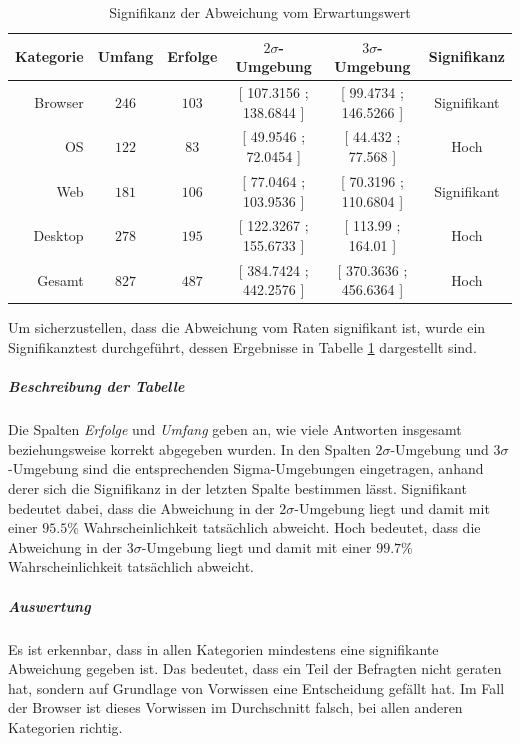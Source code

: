 \documentclass[a4paper]{article}
\begin{document}
                \begin{table}
                    \centering
                    \begin{tabular}{rccccc}
                        Kategorie & Umfang & Erfolge & $2\sigma$-Umgebung & $3\sigma$-Umgebung & Signifikanz \\\hline\hline
                        Browser & $246$ & $103$ & \tiny [ 107.3156 ; 138.6844 ] & \tiny [ 99.4734 ; 146.5266 ] & Signifikant\\
                        OS & $122$ & $83$ & \tiny [ 49.9546 ; 72.0454 ] &  \tiny [ 44.432 ; 77.568 ] & Hoch\\
                        Web & $181$ & $106$ & \tiny [ 77.0464 ; 103.9536 ] &  \tiny [ 70.3196 ; 110.6804 ] &  Signifikant\\
                        Desktop & $278$ & $195$ & \tiny [ 122.3267 ; 155.6733 ] & \tiny [ 113.99 ; 164.01 ] & Hoch\\\hline
                        Gesamt & $827$ & $487$ & \tiny [ 384.7424 ; 442.2576 ] & \tiny [ 370.3636 ; 456.6364 ] & Hoch
                    \end{tabular}
                    \caption{Signifikanz der Abweichung vom Erwartungswert}
                    \label{table:knowledge_by_category_sigma}
                \end{table}
                
                Um sicherzustellen, dass die Abweichung vom Raten signifikant ist, wurde ein Signifikanztest durchgeführt, dessen Ergebnisse in Tabelle \ref{table:knowledge_by_category_sigma} dargestellt sind. 
                
                \subparagraph{Beschreibung der Tabelle}
                    Die Spalten \emph{Erfolge} und \emph{Umfang} geben an, wie viele Antworten insgesamt beziehungsweise korrekt abgegeben wurden. In den Spalten $2\sigma$-Umgebung und $3\sigma$-Umgebung sind die entsprechenden Sigma-Umgebungen eingetragen, anhand derer sich die Signifikanz in der letzten Spalte bestimmen lässt. Signifikant bedeutet dabei, dass die Abweichung in der $2\sigma$-Umgebung liegt und damit mit einer $95.5\%$ Wahrscheinlichkeit tatsächlich abweicht. Hoch bedeutet, dass die Abweichung in der $3\sigma$-Umgebung liegt und damit mit einer $99.7\%$ Wahrscheinlichkeit tatsächlich abweicht.
                    
                \subparagraph{Auswertung}
                    Es ist erkennbar, dass in allen Kategorien mindestens eine signifikante Abweichung gegeben ist. Das bedeutet, dass ein Teil der Befragten nicht geraten hat, sondern auf Grundlage von Vorwissen eine Entscheidung gefällt hat. Im Fall der Browser ist dieses Vorwissen im Durchschnitt falsch, bei allen anderen Kategorien richtig.
                    
\end{document}

